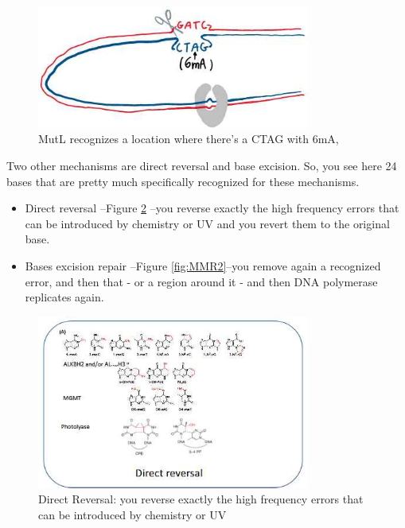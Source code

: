 \documentclass[]{article}
\begin{document}
\begin{figure}[H]
	\caption{MutL recognizes a location where there's a CTAG with 6mA,}\label{fig:DNA-MMR}
	\includegraphics[width=0.8\textwidth]{DNA-MMR}
\end{figure}

Two other mechanisms are
direct reversal and base excision.
So, you see here 24 bases that are
pretty much specifically recognized
for these mechanisms.
\begin{itemize}
	\item Direct reversal --Figure \ref{fig:MMR1} --you reverse exactly the high frequency errors
	that can be introduced by chemistry or UV
	and you revert them to the original base.
    \item Bases excision repair --Figure \ref{fig:MMR2}--you remove again a recognized error, and then that - or a region around it - 	and then DNA polymerase replicates again.
\end{itemize}

\begin{figure}[H]
	\begin{center}
		\caption[Direct Reversal]{Direct Reversal: you reverse exactly the high frequency errors 	that can be introduced by chemistry or UV}\label{fig:MMR1}
		\includegraphics[width=0.8\textwidth]{MMR1}
	\end{center}
\end{figure}
\end{document}
